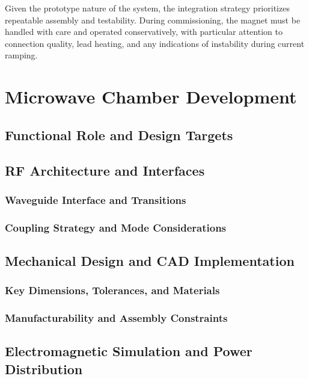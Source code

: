 \documentclass[FM,DP,EN,twoside]{tulthesis}
\begin{document}
Given the prototype nature of the system, the integration strategy prioritizes repeatable assembly and testability. During commissioning, the magnet must be handled with care and operated conservatively, with particular attention to connection quality, lead heating, and any indications of instability during current ramping.

\chapter{Microwave Chamber Development}
\label{sec:microwave-chamber-development}
\section{Functional Role and Design Targets}
\label{sec:mw-role-design-targets}
\section{RF Architecture and Interfaces}
\label{sec:rf-architecture-interfaces}
\subsection{Waveguide Interface and Transitions}
\label{subsec:waveguide-interface-transitions}
\subsection{Coupling Strategy and Mode Considerations}
\label{subsec:coupling-mode-considerations}
\section{Mechanical Design and CAD Implementation}
\label{sec:mw-mechanical-design-cad}
\subsection{Key Dimensions, Tolerances, and Materials}
\label{subsec:mw-dimensions-tolerances-materials}
\subsection{Manufacturability and Assembly Constraints}
\label{subsec:mw-manufacturability-assembly}
\section{Electromagnetic Simulation and Power Distribution}
\label{sec:mw-em-simulation-power-distribution}
\end{document}
